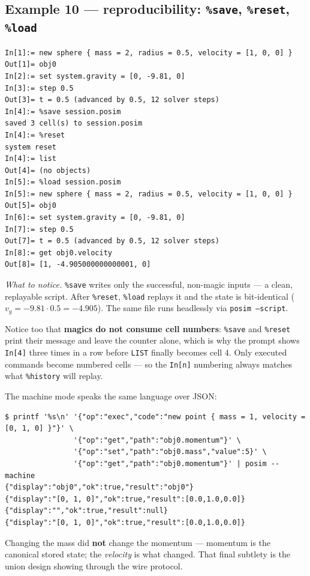 \documentclass[11pt]{article}
\newcommand{\kw}[1]{\texttt{\uppercase{#1}}}
\newcommand{\code}[1]{\texttt{#1}}
\begin{document}
\subsection{Example 10 --- reproducibility: \code{\%save}, \code{\%reset}, \code{\%load}}

\begin{lstlisting}
In[1]:= new sphere { mass = 2, radius = 0.5, velocity = [1, 0, 0] }
Out[1]= obj0
In[2]:= set system.gravity = [0, -9.81, 0]
In[3]:= step 0.5
Out[3]= t = 0.5 (advanced by 0.5, 12 solver steps)
In[4]:= %save session.posim
saved 3 cell(s) to session.posim
In[4]:= %reset
system reset
In[4]:= list
Out[4]= (no objects)
In[5]:= %load session.posim
In[5]:= new sphere { mass = 2, radius = 0.5, velocity = [1, 0, 0] }
Out[5]= obj0
In[6]:= set system.gravity = [0, -9.81, 0]
In[7]:= step 0.5
Out[7]= t = 0.5 (advanced by 0.5, 12 solver steps)
In[8]:= get obj0.velocity
Out[8]= [1, -4.905000000000001, 0]
\end{lstlisting}

\emph{What to notice.} \code{\%save} writes only the successful,
non-magic inputs --- a clean, replayable script. After \code{\%reset},
\code{\%load} replays it and the state is bit-identical
($v_y = -9.81\cdot0.5 = -4.905$). The same file runs headlessly via
\code{posim --script}.

Notice too that \textbf{magics do not consume cell numbers}:
\code{\%save} and \code{\%reset} print their message and leave the
counter alone, which is why the prompt shows \code{In[4]} three times
in a row before \kw{list} finally becomes cell 4. Only executed
commands become numbered cells --- so the \code{In[n]} numbering always
matches what \code{\%history} will replay.

The machine mode speaks the same language over JSON:

\begin{lstlisting}
$ printf '%s\n' '{"op":"exec","code":"new point { mass = 1, velocity = [0, 1, 0] }"}' \
                '{"op":"get","path":"obj0.momentum"}' \
                '{"op":"set","path":"obj0.mass","value":5}' \
                '{"op":"get","path":"obj0.momentum"}' | posim --machine
{"display":"obj0","ok":true,"result":"obj0"}
{"display":"[0, 1, 0]","ok":true,"result":[0.0,1.0,0.0]}
{"display":"","ok":true,"result":null}
{"display":"[0, 1, 0]","ok":true,"result":[0.0,1.0,0.0]}
\end{lstlisting}

Changing the mass did \textbf{not} change the momentum --- momentum is
the canonical stored state; the \emph{velocity} is what changed. That
final subtlety is the union design showing through the wire protocol.
\end{document}

